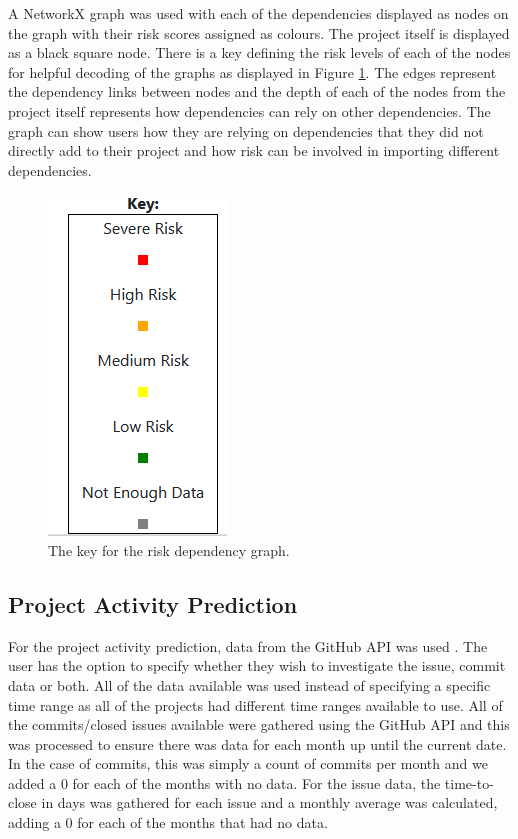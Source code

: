 \documentclass[conference]{IEEEtran}
\begin{document}
{A NetworkX graph was used with each of the dependencies displayed as nodes on the graph with their risk scores assigned as colours. The project itself is displayed as a black square node. There is a key defining the risk levels of each of the nodes for helpful decoding of the graphs as displayed in Figure \ref{fig:key}. The edges represent the dependency links between nodes and the depth of each of the nodes from the project itself represents how dependencies can rely on other dependencies. The graph can show users how they are relying on dependencies that they did not directly add to their project and how risk can be involved in importing different dependencies. 

\begin{figure}
\begin{center}
    \includegraphics[scale=0.5]{Key.png}
    \caption{The key for the risk dependency graph.}
    \label{fig:key}
\end{center}
\end{figure}

\subsection{Project Activity Prediction}
For the project activity prediction, data from the GitHub API was used \cite{noauthor_github_nodate}. The user has the option to specify whether they wish to investigate the issue, commit data or both. All of the data available was used instead of specifying a specific time range as all of the projects had different time ranges available to use. All of the commits/closed issues available were gathered using the GitHub API and this was processed to ensure there was data for each month up until the current date. In the case of commits, this was simply a count of commits per month and we added a 0 for each of the months with no data. For the issue data, the time-to-close in days was gathered for each issue and a monthly average was calculated, adding a 0 for each of the months that had no data. 

}
\end{document}
